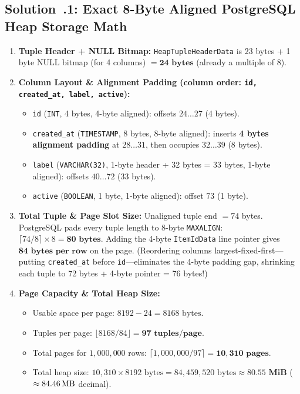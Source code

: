 \subsection{Solution~\thechapter.1: Exact 8-Byte Aligned PostgreSQL Heap Storage Math}
\begin{enumerate}[leftmargin=15pt]
  \item \textbf{Tuple Header + NULL Bitmap:} \texttt{HeapTupleHeaderData} is 23 bytes + 1 byte NULL bitmap (for 4 columns) $= \mathbf{24\text{ bytes}}$ (already a multiple of 8).
  \item \textbf{Column Layout \& Alignment Padding (column order: \texttt{id, created\_at, label, active}):}
  \begin{itemize}
    \item \texttt{id} (\texttt{INT}, 4 bytes, 4-byte aligned): offsets $24\dots 27$ (4 bytes).
    \item \texttt{created\_at} (\texttt{TIMESTAMP}, 8 bytes, 8-byte aligned): inserts \textbf{4 bytes alignment padding} at $28\dots 31$, then occupies $32\dots 39$ (8 bytes).
    \item \texttt{label} (\texttt{VARCHAR(32)}, 1-byte header + 32 bytes = 33 bytes, 1-byte aligned): offsets $40\dots 72$ (33 bytes).
    \item \texttt{active} (\texttt{BOOLEAN}, 1 byte, 1-byte aligned): offset $73$ (1 byte).
  \end{itemize}
  \item \textbf{Total Tuple \& Page Slot Size:} Unaligned tuple end $= 74$ bytes. PostgreSQL pads every tuple length to 8-byte \texttt{MAXALIGN}: $\lceil 74 / 8 \rceil \times 8 = \mathbf{80\text{ bytes}}$. Adding the 4-byte \texttt{ItemIdData} line pointer gives $\mathbf{84\text{ bytes per row}}$ on the page. (Reordering columns largest-fixed-first---putting \texttt{created\_at} before \texttt{id}---eliminates the 4-byte padding gap, shrinking each tuple to 72 bytes + 4-byte pointer = 76 bytes!)
  \item \textbf{Page Capacity \& Total Heap Size:}
  \begin{itemize}
    \item Usable space per page: $8192 - 24 = 8168\text{ bytes}$.
    \item Tuples per page: $\lfloor 8168 / 84 \rfloor = \mathbf{97\text{ tuples/page}}$.
    \item Total pages for $1{,}000{,}000$ rows: $\lceil 1{,}000{,}000 / 97 \rceil = \mathbf{10{,}310\text{ pages}}$.
    \item Total heap size: $10{,}310 \times 8192\text{ bytes} = 84{,}459{,}520\text{ bytes} \approx \mathbf{80.55\text{ MiB}}$ ($\approx 84.46\text{\,MB}$ decimal).
  \end{itemize}
\end{enumerate}

